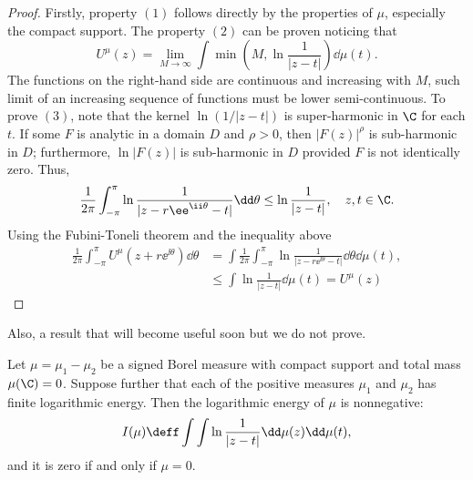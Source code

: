 \begin{proof}
	Firstly, property $(1)$ follows directly by the properties of $\mu$, especially the compact support. The property $(2)$ can be proven noticing that
	\begin{equation}
		U^\mu(z) = \lim_{M \rightarrow \infty} \int \min\left( M, \ln \frac{1}{|z - t|} \right) \dd \mu (t).
	\end{equation}
	The functions on the right-hand side are continuous and increasing with $M$, such limit of an increasing sequence of functions must be lower semi-continuous. To prove $(3)$, note that the kernel $\ln(1/|z-t|)$ is super-harmonic in $\C$ for each $t$. If some $F$ is analytic in a domain $D$ and $\rho > 0$, then $|F(z)|^\rho$ is sub-harmonic in $D$; furthermore, $\ln |F(z)|$ is sub-harmonic in $D$ provided $F$ is not identically zero. Thus, 
	\begin{equation}
		\frac{1}{2\pi} \int_{-\pi}^{\pi} \ln{\frac{1}{|z - r\ee^{\ii \theta} - t|}} \dd \theta \leq \ln \frac{1}{|z-t|}, \quad z, t \in \C.
	\end{equation}
	Using the Fubini-Toneli theorem and the inequality above
	\begin{align}
		\frac{1}{2\pi} \int_{-\pi}^{\pi} U^\mu (z + r \ee^{\ii \theta}) \dd \theta & = \int \frac{1}{2\pi} \int_{-\pi}^{\pi} \ln{\frac{1}{|z - r\ee^{\ii \theta} - t|}} \dd \theta \dd \mu(t), \\
		& \leq \int \ln \frac{1}{|z-t|} \dd \mu(t) = U^\mu (z)
	\end{align}
\end{proof}

Also, a result that will become useful soon but we do not prove.

\begin{lema} \cite{saff2024logarithmic}
	Let $\mu = \mu_1 - \mu_2$ be a signed Borel measure with compact support	and total mass $\mu(\C) = 0$. Suppose further that each of the positive measures $\mu_1$ and $\mu_2$ has finite logarithmic energy. Then the logarithmic energy of $\mu$ is nonnegative:
	\begin{equation}
		I(\mu) \deff \int \int \ln \frac{1}{|z-t|} \dd \mu(z) \dd \mu (t),
	\end{equation}
	and it is zero if and only if $\mu = 0$.
	\label{Lema: positive kernel}
\end{lema}

